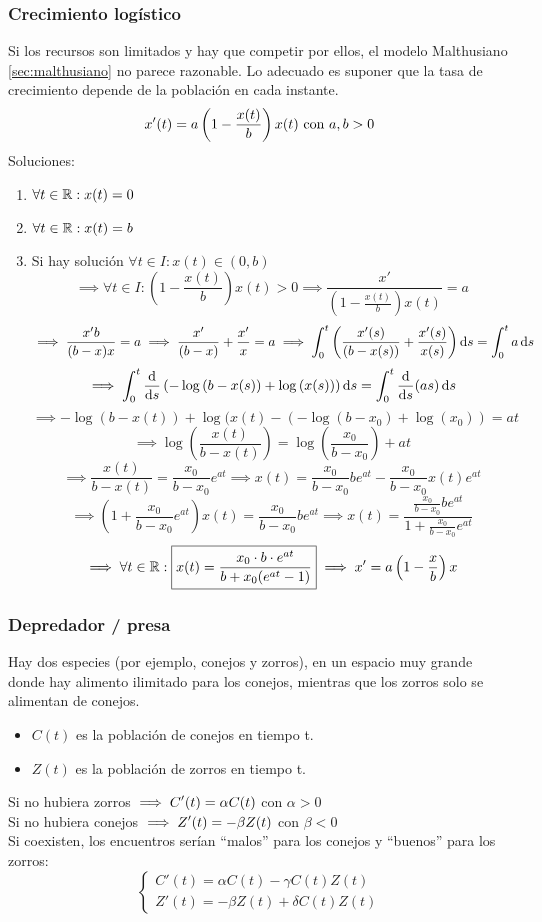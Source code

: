 \subsubsection{Crecimiento logístico}
Si los recursos son limitados y hay que competir por ellos, el modelo Malthusiano \ref{sec:malthusiano} no parece razonable. Lo adecuado es suponer que la tasa de crecimiento depende de la población en cada instante.
\[x'(t)=a\left(1-\frac{x(t)}{b}\right)x(t) \text{ con } a, b > 0\]
Soluciones:
\begin{enumerate}
	\item $\forall t\in \mathbb{R} : x(t)=0$
	\item $\forall t\in \mathbb{R} : x(t)=b$
	\item Si hay solución $\forall t\in I:x(t)\in (0,b)$
	      \[\implies \forall t\in I: \left(1-\frac{x(t)}{b}\right)x(t)>0 \implies \frac{x'}{\left(1-\frac{x(t)}{b}\right)x(t)}=a\]
	      \[\implies \frac{x'b}{(b-x)x}=a\implies \frac{x'}{(b-x)}+\frac{x'}{x}=a \implies \int_0^t\left(\frac{x'(s)}{(b-x(s))}+\frac{x'(s)}{x(s)}\right)\odif{s}=\int_0^t a \odif{s}\]
	      \[\implies \int_0^t\odv{}{s}\left(-\log{(b-x(s))}+\log{(x(s))}\right)\odif{s}=\int_0^t\odv{}{s}(as)\odif{s}\]
	      \[\implies -\log{(b-x(t))}+\log{(x(t)}-\left(-\log{(b-x_0)}+\log{(x_0)}\right)=at\]
	      \[\implies \log{\left(\frac{x(t)}{b-x(t)}\right)}=\log{\left(\frac{x_0}{b-x_0}\right)}+at\]
	      \[\implies \frac{x(t)}{b-x(t)}=\frac{x_0}{b-x_0}e^{at}\implies x(t)=\frac{x_0}{b-x_0}be^{at}-\frac{x_0}{b-x_0}x(t)e^{at}\]
	      \[\implies \left(1+\frac{x_0}{b-x_0}e^{at}\right)x(t)=\frac{x_0}{b-x_0}be^{at}\implies x(t)=\frac{\frac{x_0}{b-x_0}be^{at}}  {1+\frac{x_0}{b-x_0}e^{at}}\]
	      \[\implies \forall t \in \mathbb{R} : \boxed{x(t) = \frac{x_0\cdot b\cdot e^{at}}{b+x_0(e^{at}-1)}} \implies x'=a\left(1-\frac{x}{b}\right)x\]
\end{enumerate}

\subsubsection{Depredador / presa}
Hay dos especies (por ejemplo, conejos y zorros), en un espacio muy grande donde hay alimento ilimitado para los conejos, mientras que los zorros solo se alimentan de conejos.
\begin{itemize}
	\item $C(t)$ es la población de conejos en tiempo t.
	\item $Z(t)$ es la población de zorros en tiempo t.
\end{itemize}
Si no hubiera zorros $\displaystyle \implies C'(t)=\alpha C(t)$ con $\alpha > 0$ \\
Si no hubiera conejos $\displaystyle \implies Z'(t)=-\beta Z(t)$ con $\beta < 0$ \\
Si coexisten, los encuentros serían ``malos'' para los conejos y ``buenos'' para los zorros:
\[\begin{cases}
		C'(t) = \alpha C(t) - \gamma C(t)Z(t) \\
		Z'(t) = -\beta Z(t) + \delta C(t)Z(t)
	\end{cases}\]

